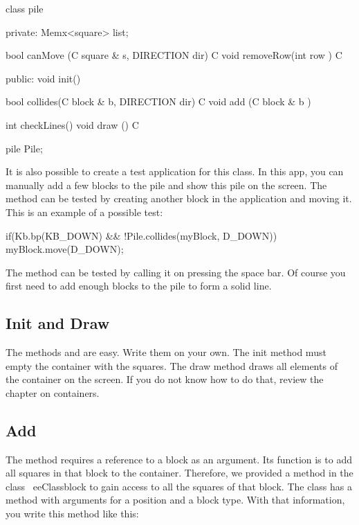 \begin{code}
class pile
{
private:
   Memx<square> list;
   
   bool canMove  (C square & s,  DIRECTION dir) C {}   
   void removeRow(int row                     ) C {}
   
public:
   void init() {}
   
   bool collides(C block & b, DIRECTION dir) C {}   
   void add     (C block & b               )   {}
   
   int checkLines()   {}   
   void draw     () C {}
}

pile Pile;
\end{code}

It is also possible to create a test application for this class. In this app, you can manually add a few blocks to the pile and show this pile on the screen. The  method can be tested by creating another block in the application and moving it. This is an example of a possible test:

\begin{code}
if(Kb.bp(KB_DOWN) && !Pile.collides(myBlock, D_DOWN)) {
  myBlock.move(D_DOWN);
}
\end{code}

The  method can be tested by calling it on pressing the space bar. Of course you first need to add enough blocks to the pile to form a solid line.

\subsection{Init and Draw}
The methods  and  are easy. Write them on your own. The init method must empty the container with the squares. The draw method draws all elements of the container on the screen. If you do not know how to do that, review the chapter on containers.

\subsection{Add}
The  method requires a reference to a block as an argument. Its function is to add all squares in that block to the container. Therefore, we provided a method in the class \ eeClass{block} to gain access to all the squares of that block. The class  has a method  with arguments for a position and a block type. With that information, you write this method like this:

